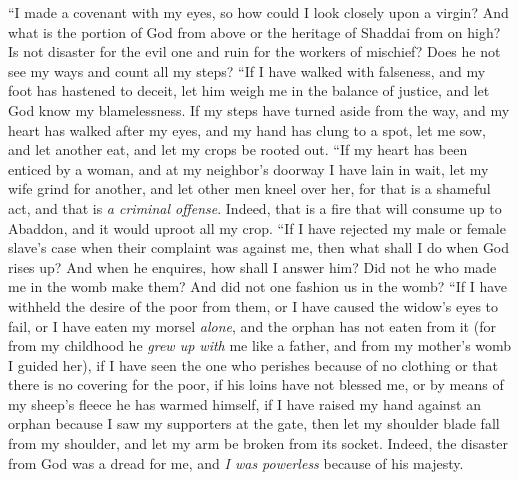 \begin{biblechapter} %
 “I made a covenant with my eyes, 
so how could I look closely upon a virgin?
\verse And what is the portion of God from above 
or the heritage of Shaddai from on high?
\verse Is not disaster for the evil one 
and ruin for the workers of mischief?
\verse Does he not see my ways 
and count all my steps?
\verse “If I have walked with falseness, 
and my foot has hastened to deceit,
\verse let him weigh me in the balance of justice, 
and let God know my blamelessness.
\verse If my steps have turned aside from the way, 
and my heart has walked after my eyes, 
and my hand has clung to a spot,
\verse let me sow, and let another eat, 
and let my crops be rooted out.
\verse “If my heart has been enticed by a woman, 
and at my neighbor’s doorway I have lain in wait,
\verse let my wife grind for another, 
and let other men kneel over her,
\verse for that is a shameful act, 
and that is \textit{a criminal offense}.
\verse Indeed, that is a fire that will consume up to Abaddon, 
and it would uproot all my crop.
\verse “If I have rejected my male or female slave’s case 
when their complaint was against me,
\verse then what shall I do when God rises up? 
And when he enquires, how shall I answer him?
\verse Did not he who made me in the womb make them? 
And did not one fashion us in the womb?
\verse “If I have withheld the desire of the poor from them, 
or I have caused the widow’s eyes to fail,
\verse or I have eaten my morsel \textit{alone}, 
and the orphan has not eaten from it
\verse (for from my childhood he \textit{grew up with} me like a father, 
and from my mother’s womb I guided her),
\verse if I have seen the one who perishes because of no clothing 
or that there is no covering for the poor,
\verse if his loins have not blessed me, 
or by means of my sheep’s fleece he has warmed himself,
\verse if I have raised my hand against an orphan 
because I saw my supporters at the gate,
\verse then let my shoulder blade fall from my shoulder, 
and let my arm be broken from its socket.
\verse Indeed, the disaster from God was a dread for me, 
and \textit{I was powerless} because of his majesty.

\end{biblechapter}
